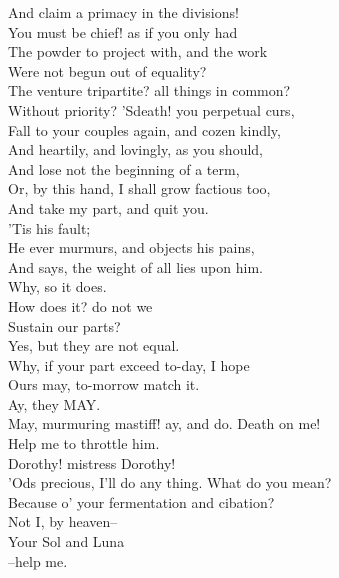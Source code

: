 \documentclass{memoir}
\begin{document}
\begin{drama*}
 And claim a primacy in the divisions!\\
 You must be chief! as if you only had\\
 The powder to project with, and the work\\
 Were not begun out of equality?\\
 The venture tripartite? all things in common?\\
 Without priority? 'Sdeath! you perpetual curs,\\
 Fall to your couples again, and cozen kindly,\\
 And heartily, and lovingly, as you should,\\
 And lose not the beginning of a term,\\
 Or, by this hand, I shall grow factious too,\\
 And take my part, and quit you.\\
\facespeaks {} 'Tis his fault;\\
 He ever murmurs, and objects his pains,\\
 And says, the weight of all lies upon him.\\
\subtlespeaks  Why, so it does.\\
\dolspeaks {} How does it? do not we\\
 Sustain our parts?\\
\subtlespeaks {} Yes, but they are not equal.\\
\dolspeaks  Why, if your part exceed to-day, I hope\\
 Ours may, to-morrow match it.\\
\subtlespeaks {} Ay, they MAY.\\
\dolspeaks  May, murmuring mastiff! ay, and do. Death on me!\\
 Help me to throttle him.\\
\subtlespeaks {} Dorothy! mistress Dorothy!\\
 'Ods precious, I'll do any thing. What do you mean?\\
\dolspeaks  Because o' your fermentation and cibation?\\
\subtlespeaks  Not I, by heaven--\\
\dolspeaks {} Your Sol and Luna\\
 --help me.\\

\end{drama*}
\end{document}
